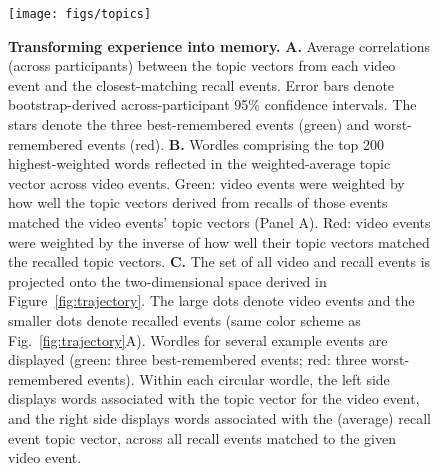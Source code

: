 \documentclass{article}
\begin{document}
\begin{figure}[tp]
\centering
\texttt{[image: figs/topics]}
\caption{\small \textbf{Transforming experience into memory.} \textbf{A.} Average correlations (across participants) between the topic vectors from each video event and the closest-matching recall events.  Error bars denote bootstrap-derived across-participant 95\% confidence intervals.  The stars denote the three best-remembered events (green) and worst-remembered events (red).  \textbf{B.} Wordles comprising the top 200 highest-weighted words reflected in the weighted-average topic vector across video events.  Green: video events were weighted by how well the topic vectors derived from recalls of those events matched the video events' topic vectors (Panel A).  Red: video events were weighted by the inverse of how well their topic vectors matched the recalled topic vectors.  \textbf{C.}  The set of all video and recall events is projected onto the two-dimensional space derived in Figure~\ref{fig:trajectory}.  The large dots denote video events and the smaller dots denote recalled events (same color scheme as Fig.~\ref{fig:trajectory}A).  Wordles for several example events are displayed (green: three best-remembered events; red: three worst-remembered events).  Within each circular wordle, the left side displays words associated with the topic vector for the video event, and the right side displays words associated with the (average) recall event topic vector, across all recall events matched to the given video event.}
\label{fig:topics}
\end{figure}
\end{document}
